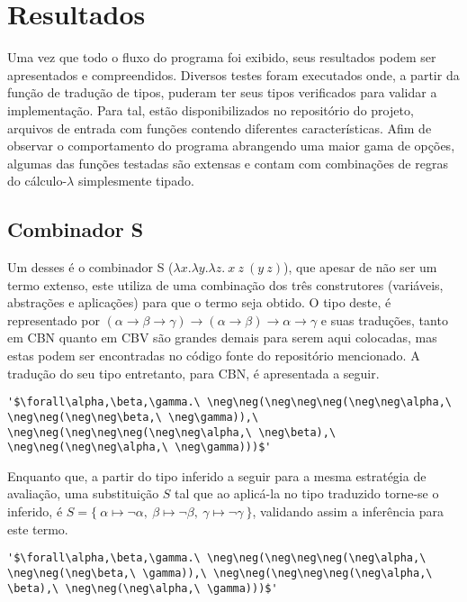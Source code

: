 \chapter{Resultados}\label{ch:resultados}
Uma vez que todo o fluxo do programa foi exibido, seus resultados podem ser apresentados e compreendidos.
Diversos testes foram executados onde, a partir da função de tradução de tipos, puderam ter seus tipos verificados para validar a implementação.
Para tal, estão disponibilizados no repositório do projeto, arquivos de entrada com funções contendo diferentes características.
Afim de observar o comportamento do programa abrangendo uma maior gama de opções, algumas das funções testadas são extensas e contam com combinações de regras do cálculo-$\lambda$ simplesmente tipado.

\section{Combinador S}
Um desses é o combinador S ($\lambda x.\lambda y.\lambda z.\ x\ z\ (y\ z)$), que apesar de não ser um termo extenso, este utiliza de uma combinação dos três construtores (variáveis, abstrações e aplicações) para que o termo seja obtido.
O tipo deste, é representado por $(\alpha \to \beta \to \gamma) \to (\alpha \to \beta) \to \alpha \to \gamma$ e suas traduções, tanto em CBN quanto em CBV são grandes demais para serem aqui colocadas, mas estas podem ser encontradas no código fonte do repositório mencionado.
A tradução do seu tipo entretanto, para CBN, é apresentada a seguir.
\lstset{extendedchars=false, escapeinside=''}
\begin{lstlisting}[style=output,caption={Tradução em CBN do tipo do combinador S}]
  '$\forall\alpha,\beta,\gamma.\ \neg\neg(\neg\neg\neg(\neg\neg\alpha,\ \neg\neg(\neg\neg\beta,\ \neg\gamma)),\ \neg\neg(\neg\neg\neg(\neg\neg\alpha,\ \neg\beta),\ \neg\neg(\neg\neg\alpha,\ \neg\gamma)))$'
\end{lstlisting}
Enquanto que, a partir do tipo inferido a seguir para a mesma estratégia de avaliação, uma substituição $S$ tal que ao aplicá-la no tipo traduzido torne-se o inferido, é $S = \{\ \alpha \mapsto \neg\alpha,\ \beta \mapsto \neg\beta,\ \gamma \mapsto \neg\gamma\ \}$, validando assim a inferência para este termo.
\lstset{extendedchars=false, escapeinside=''}
\begin{lstlisting}[style=output,caption={Inferência do tipo do combinador S traduzido em CBN}]
  '$\forall\alpha,\beta,\gamma.\ \neg\neg(\neg\neg\neg(\neg\alpha,\ \neg\neg(\neg\beta,\ \gamma)),\ \neg\neg(\neg\neg\neg(\neg\alpha,\ \beta),\ \neg\neg(\neg\alpha,\ \gamma)))$'
\end{lstlisting}
